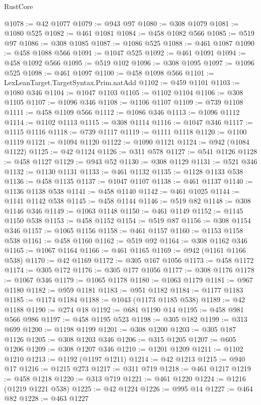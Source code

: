\begin{lexlean}{RustCore}
\begin{coremodule}
@1078 := @42 @1077
@1079 := @943 @97
@1080 := @308 @1079
@1081 := @1080 @525
@1082 := @461 @1081
@1084 := @458 @1082 @566
@1085 := @519 @97
@1086 := @308 @1085
@1087 := @1086 @525
@1088 := @461 @1087
@1090 := @458 @1088 @566
@1091 := @1047 @525
@1092 := @461 @1091
@1094 := @458 @1092 @566
@1095 := @519 @102
@1096 := @308 @1095
@1097 := @1096 @525
@1098 := @461 @1097
@1100 := @458 @1098 @566
@1101 := LexLeanTarget.TargetSyntax.Prim.natAdd
@1102 := @459 @1101
@1103 := @1080 @346
@1104 := @1047 @1103
@1105 := @1102 @1104
@1106 := @308 @1105
@1107 := @1096 @346
@1108 := @1106 @1107
@1109 := @739 @1108
@1111 := @458 @1109 @566
@1112 := @1086 @346
@1113 := @1096 @1112
@1114 := @1102 @1113
@1115 := @308 @1114
@1116 := @1047 @346
@1117 := @1115 @1116
@1118 := @739 @1117
@1119 := @1111 @1118
@1120 := @1100 @1119
@1121 := @1094 @1120
@1122 := @1090 @1121
@1124 := @942 (@1084 @1122)
@1125 := @42 @1124
@1126 := @311 @578
@1127 := @541 @1126
@1128 := @458 @1127
@1129 := @943 @52
@1130 := @308 @1129
@1131 := @521 @346
@1132 := @1130 @1131
@1133 := @461 @1132
@1135 := @1128 @1133 @538
@1136 := @458 @1135
@1137 := @1047 @1107
@1138 := @461 @1137
@1140 := @1136 @1138 @538
@1141 := @458 @1140
@1142 := @461 @1025
@1144 := @1141 @1142 @538
@1145 := @458 @1144
@1146 := @519 @82
@1148 := @308 @1146 @346
@1149 := @1063 @1148
@1150 := @461 @1149
@1152 := @1145 @1150 @538
@1153 := @458 @1152
@1154 := @519 @87
@1156 := @308 @1154 @346
@1157 := @1065 @1156
@1158 := @461 @1157
@1160 := @1153 @1158 @538
@1161 := @458 @1160
@1162 := @519 @92
@1164 := @308 @1162 @346
@1165 := @1067 @1164
@1166 := @461 @1165
@1169 := @942 (@1161 @1166 @538)
@1170 := @42 @1169
@1172 := @305 @167 @1056
@1173 := @458 @1172
@1174 := @305 @172
@1176 := @305 @177 @1056
@1177 := @308 @1176
@1178 := @1067 @346
@1179 := @1065 @1178
@1180 := @1063 @1179
@1181 := @967 @1180
@1182 := @959 @1181
@1183 := @951 @1182
@1184 := @1177 @1183
@1185 := @1174 @1184
@1188 := @1043 (@1173 @1185 @538)
@1189 := @42 @1188
@1190 := @274 @18
@1192 := @681 @1190 @14
@1195 := @458 @981 @566 @986
@1197 := @458 @1195 @523
@1198 := @305 @182
@1199 := @313 @699
@1200 := @1198 @1199
@1201 := @308 @1200
@1203 := @305 @187 @1126
@1205 := @308 @1203 @346
@1206 := @315 @1205
@1207 := @605 @1206
@1209 := @308 @1207 @346
@1210 := @1201 @1209
@1211 := @1102 @1210
@1213 := @1192 (@1197 @1211)
@1214 := @42 @1213
@1215 := @940 @17
@1216 := @1215 @273
@1217 := @311 @719
@1218 := @461 @1217
@1219 := @458 @1218
@1220 := @313 @719
@1221 := @461 @1220
@1224 := @1216 (@1219 @1221 @538)
@1225 := @42 @1224
@1226 := @995 @14
@1227 := @464 @82
@1228 := @463 @1227

\end{coremodule}
\end{lexlean}
